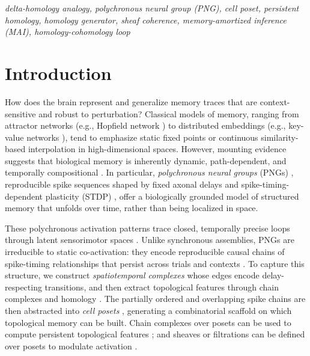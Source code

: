 \documentclass[lettersize,journal]{IEEEtran}
\begin{document}
 {\em delta-homology analogy, polychronous neural group (PNG), cell poset, persistent homology, homology generator, sheaf coherence, memory-amortized inference (MAI), homology-cohomology loop
}


\section{Introduction}

How does the brain represent and generalize memory traces that are context-sensitive and robust to perturbation? Classical models of memory, ranging from attractor networks (e.g., Hopfield network \cite{hopfield1982neural,ramsauer2020hopfield}) to distributed embeddings (e.g., key-value networks \cite{weston2014memory,miller2016key}), tend to emphasize static fixed points or continuous similarity-based interpolation in high-dimensional spaces. However, mounting evidence suggests that biological memory is inherently dynamic, path-dependent, and temporally compositional \cite{hasson2015hierarchical,squire1993structure}. In particular, \emph{polychronous neural groups} (PNGs) \cite{izhikevich2006polychronization}, reproducible spike sequences shaped by fixed axonal delays and spike-timing-dependent plasticity (STDP) \cite{caporale2008spike}, offer a biologically grounded model of structured memory that unfolds over time, rather than being localized in space.

These polychronous activation patterns trace closed, temporally precise loops through latent sensorimotor spaces \cite{sohn2021network}. Unlike synchronous assemblies, PNGs are irreducible to static co-activation: they encode reproducible causal chains of spike-timing relationships that persist across trials and contexts \cite{wang2010neurophysiological}. To capture this structure, we construct \emph{spatiotemporal complexes} whose edges encode delay-respecting transitions, and then extract topological features through chain complexes and homology \cite{edelsbrunner2010computational}. The partially ordered and overlapping spike chains are then abstracted into \emph{cell posets} \cite{ayzenberg2025sheaf}, generating a combinatorial scaffold on which topological memory can be built. Chain complexes over posets can be used to compute persistent topological features \cite{edelsbrunner2008persistent}; and sheaves or filtrations can be defined over posets to modulate activation \cite{hatcher2005algebraic}.
\end{document}
